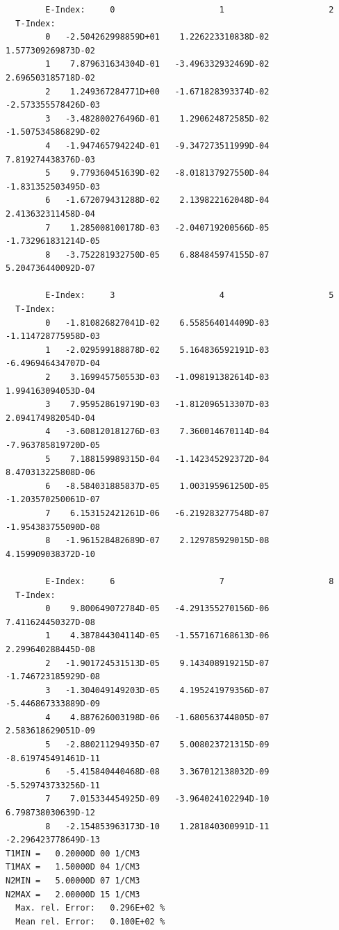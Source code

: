 \documentclass[12pt,dvipdfmx]{article}
\begin{document}
\begin{small}\begin{verbatim}
        E-Index:     0                     1                     2
  T-Index:
        0   -2.504262998859D+01    1.226223310838D-02    1.577309269873D-02
        1    7.879631634304D-01   -3.496332932469D-02    2.696503185718D-02
        2    1.249367284771D+00   -1.671828393374D-02   -2.573355578426D-03
        3   -3.482800276496D-01    1.290624872585D-02   -1.507534586829D-02
        4   -1.947465794224D-01   -9.347273511999D-04    7.819274438376D-03
        5    9.779360451639D-02   -8.018137927550D-04   -1.831352503495D-03
        6   -1.672079431288D-02    2.139822162048D-04    2.413632311458D-04
        7    1.285008100178D-03   -2.040719200566D-05   -1.732961831214D-05
        8   -3.752281932750D-05    6.884845974155D-07    5.204736440092D-07

        E-Index:     3                     4                     5
  T-Index:
        0   -1.810826827041D-02    6.558564014409D-03   -1.114728775958D-03
        1   -2.029599188878D-02    5.164836592191D-03   -6.496946434707D-04
        2    3.169945750553D-03   -1.098191382614D-03    1.994163094053D-04
        3    7.959528619719D-03   -1.812096513307D-03    2.094174982054D-04
        4   -3.608120181276D-03    7.360014670114D-04   -7.963785819720D-05
        5    7.188159989315D-04   -1.142345292372D-04    8.470313225808D-06
        6   -8.584031885837D-05    1.003195961250D-05   -1.203570250061D-07
        7    6.153152421261D-06   -6.219283277548D-07   -1.954383755090D-08
        8   -1.961528482689D-07    2.129785929015D-08    4.159909038372D-10

        E-Index:     6                     7                     8
  T-Index:
        0    9.800649072784D-05   -4.291355270156D-06    7.411624450327D-08
        1    4.387844304114D-05   -1.557167168613D-06    2.299640288445D-08
        2   -1.901724531513D-05    9.143408919215D-07   -1.746723185929D-08
        3   -1.304049149203D-05    4.195241979356D-07   -5.446867333889D-09
        4    4.887626003198D-06   -1.680563744805D-07    2.583618629051D-09
        5   -2.880211294935D-07    5.008023721315D-09   -8.619745491461D-11
        6   -5.415840440468D-08    3.367012138032D-09   -5.529743733256D-11
        7    7.015334454925D-09   -3.964024102294D-10    6.798738030639D-12
        8   -2.154853963173D-10    1.281840300991D-11   -2.296423778649D-13
T1MIN =   0.20000D 00 1/CM3
T1MAX =   1.50000D 04 1/CM3
N2MIN =   5.00000D 07 1/CM3
N2MAX =   2.00000D 15 1/CM3
  Max. rel. Error:   0.296E+02 %
  Mean rel. Error:   0.100E+02 %
\end{verbatim}\end{small}
\end{document}
